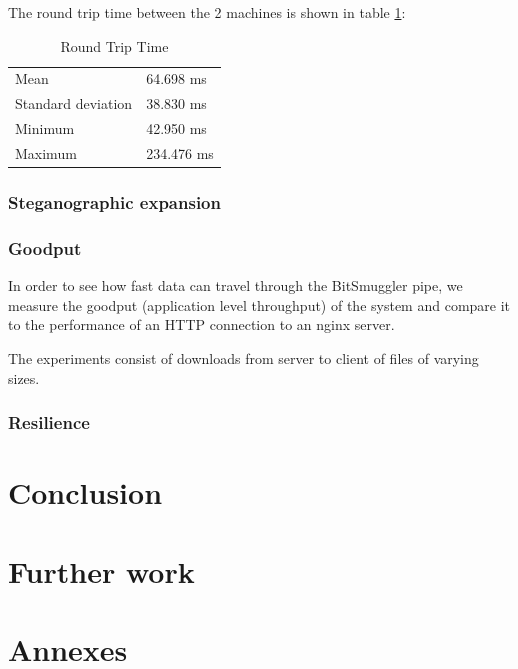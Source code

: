 \documentclass[11pt]{book} %
\newcommand{\projectName}{BitSmuggler }
\begin{document}
The round trip time between the 2 machines is shown in table \ref{table:rtt}:

\begin{table}[!htbp]
    \begin{tabular}{|l|l|}
    \hline
    Mean               & 64.698 ms  \\
    Standard deviation & 38.830 ms  \\
    Minimum            & 42.950 ms  \\
    Maximum            & 234.476 ms \\ \hline
    \end{tabular}
    \caption {Round Trip Time}
   \label{table:rtt}
\end{table}

\subsubsection{Steganographic expansion}

\subsubsection{Goodput}

In order to see how fast data can travel through the \projectName pipe, we measure the goodput (application level throughput) of the system and compare it to the performance of an HTTP connection to an nginx server.

The experiments consist of downloads from server to client of files of varying sizes.

\subsubsection{Resilience}

\section{Conclusion}

\section{Further work}


\section{Annexes}
\end{document}
